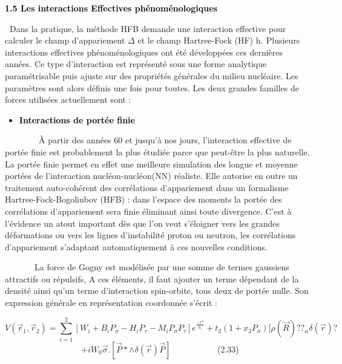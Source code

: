 \documentclass[a4paper]{article}
\begin{document}
\textbf{\textcolor{black}{1.5 Les interactions Effectives phénoménologiques}}

\textbf{\textcolor{black}{\ }}Dans la pratique, la méthode HFB demande une interaction effective pour calculer le champ
d’appariement $\Delta $ et le champ Hartree-Fock (HF) h.\textbf{\textcolor{black}{ }}Plusieurs interactions effectives
phénoménologiques ont été développées ces dernières années. Ce type d’interaction est représenté sous une forme
analytique paramétrisable puis ajuste sur des propriétés générales du milieu nucléaire. Les paramètres sont alors
définis une fois pour toutes. Les deux grandes familles de forces utilisées actuellement sont
:\textbf{\textcolor{black}{ }}


\bigskip

\begin{itemize}
\item \textbf{\textcolor{black}{Interactions de portée finie}}\textcolor{black}{ \ \ }
\end{itemize}

\bigskip

\ \ \ \ \ \ \ \ À partir des années 60 et jusqu’à nos jours, l’interaction effective de portée finie est probablement la
plus étudiée parce que peut-être la plus naturelle. La portée finie permet en effet une meilleure simulation des longue
et moyenne portées de l’interaction nucléon-nucléon(NN) réaliste. Elle autorise en outre un traitement auto-cohérent
des corrélations d’appariement dans un formalisme Hartree-Fock-Bogoliubov (HFB) : dans l’espace des moments la portée
des corrélations d’appariement sera finie éliminant ainsi toute divergence. C’est à l’évidence un atout important dès
que l’on veut s’éloigner vers les grandes déformations ou vers les lignes d’instabilité proton ou neutron, les
corrélations d’appariement s’adaptant automatiquement à ces nouvelles conditions. 

\ \ \ \ \ \ \ La force de Gogny est modélisée par une somme de termes gaussiens attractifs ou répulsifs, A ces éléments,
il faut ajouter un terme dépendant de la densité ainsi qu'un terme d'interaction spin-orbite, tous deux de portée
nulle. Son expression générale en représentation coordonnée s'écrit :


\bigskip

\begin{equation*}
V\left(\overrightarrow r_1,\overrightarrow r_2\right)=\sum _{i=1}^2\left[W_i+B_iP_{\sigma }-H_iP_{\tau }-M_iP_{\sigma
}P_{\tau }\right]e^{\frac{-r^2}{\mu _i}}+t_3\left(1+x_3P_{\sigma }\right)[\rho (\overrightarrow R)??_{\alpha }\delta
\left(\overrightarrow r\right)?
\end{equation*}
\ \ \ \ \ \ \ \ \ \ \ \ \ \ \ \ \ \  $+iW_0\overrightarrow{\sigma }.\left[\overrightarrow P\ast {\wedge}\delta
\left(\overrightarrow r\right)\overrightarrow P\right]$\ \ \ \ \ \ \ \ \ \ \ (2.33)
\end{document}
